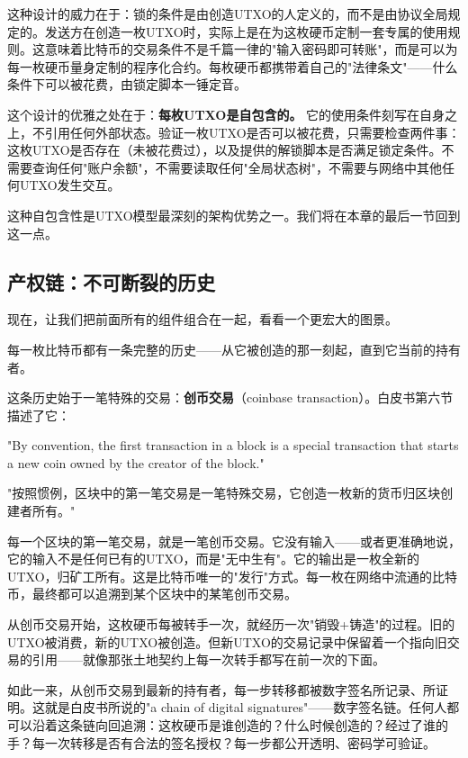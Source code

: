 \documentclass[a4paper,12pt,openany]{ctexbook}
\newenvironment{quoting}{%
  \par\vspace{0.5em}%
  \begin{list}{}{%
    \setlength{\leftmargin}{2em}%
    \setlength{\rightmargin}{2em}%
    \setlength{\parsep}{0.3em}%
    \setlength{\itemsep}{0pt}%
    \setlength{\topsep}{0pt}%
  }%
  \item\relax
}{%
  \end{list}%
  \par\vspace{0.5em}%
}
\begin{document}
这种设计的威力在于：锁的条件是由创造UTXO的人定义的，而不是由协议全局规定的。发送方在创造一枚UTXO时，实际上是在为这枚硬币定制一套专属的使用规则。这意味着比特币的交易条件不是千篇一律的"输入密码即可转账"，而是可以为每一枚硬币量身定制的程序化合约。每枚硬币都携带着自己的"法律条文"——什么条件下可以被花费，由锁定脚本一锤定音。

这个设计的优雅之处在于：\textbf{每枚UTXO是自包含的。} 它的使用条件刻写在自身之上，不引用任何外部状态。验证一枚UTXO是否可以被花费，只需要检查两件事：这枚UTXO是否存在（未被花费过），以及提供的解锁脚本是否满足锁定条件。不需要查询任何"账户余额"，不需要读取任何"全局状态树"，不需要与网络中其他任何UTXO发生交互。

这种自包含性是UTXO模型最深刻的架构优势之一。我们将在本章的最后一节回到这一点。


\subsection*{产权链：不可断裂的历史}


现在，让我们把前面所有的组件组合在一起，看看一个更宏大的图景。

每一枚比特币都有一条完整的历史——从它被创造的那一刻起，直到它当前的持有者。

这条历史始于一笔特殊的交易：\textbf{创币交易}（coinbase transaction）。白皮书第六节描述了它：


\begin{quoting}
\small
"By convention, the first transaction in a block is a special transaction that starts a new coin owned by the creator of the block."

"按照惯例，区块中的第一笔交易是一笔特殊交易，它创造一枚新的货币归区块创建者所有。"
\end{quoting}


每一个区块的第一笔交易，就是一笔创币交易。它没有输入——或者更准确地说，它的输入不是任何已有的UTXO，而是"无中生有"。它的输出是一枚全新的UTXO，归矿工所有。这是比特币唯一的"发行"方式。每一枚在网络中流通的比特币，最终都可以追溯到某个区块中的某笔创币交易。

从创币交易开始，这枚硬币每被转手一次，就经历一次"销毁+铸造"的过程。旧的UTXO被消费，新的UTXO被创造。但新UTXO的交易记录中保留着一个指向旧交易的引用——就像那张土地契约上每一次转手都写在前一次的下面。

如此一来，从创币交易到最新的持有者，每一步转移都被数字签名所记录、所证明。这就是白皮书所说的"a chain of digital signatures"——数字签名链。任何人都可以沿着这条链向回追溯：这枚硬币是谁创造的？什么时候创造的？经过了谁的手？每一次转移是否有合法的签名授权？每一步都公开透明、密码学可验证。
\end{document}
